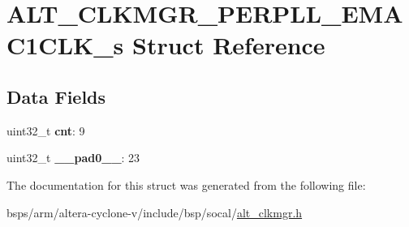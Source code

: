 \hypertarget{structALT__CLKMGR__PERPLL__EMAC1CLK__s}{}\section{A\+L\+T\+\_\+\+C\+L\+K\+M\+G\+R\+\_\+\+P\+E\+R\+P\+L\+L\+\_\+\+E\+M\+A\+C1\+C\+L\+K\+\_\+s Struct Reference}
\label{structALT__CLKMGR__PERPLL__EMAC1CLK__s}
\subsection*{Data Fields}
\begin{DoxyCompactItemize}
\item 
\mbox{\label{structALT__CLKMGR__PERPLL__EMAC1CLK__s_a3ca855c703f56b75c4fee03c093be804}} 
uint32\+\_\+t {\bfseries cnt}\+: 9
\item 
\mbox{\label{structALT__CLKMGR__PERPLL__EMAC1CLK__s_ad85736bb8615295d0e524a005564d3e0}} 
uint32\+\_\+t {\bfseries \+\_\+\+\_\+pad0\+\_\+\+\_\+}\+: 23
\end{DoxyCompactItemize}


The documentation for this struct was generated from the following file\+:\begin{DoxyCompactItemize}
\item 
bsps/arm/altera-\/cyclone-\/v/include/bsp/socal/\mbox{\hyperlink{alt__clkmgr_8h}{alt\+\_\+clkmgr.\+h}}\end{DoxyCompactItemize}

